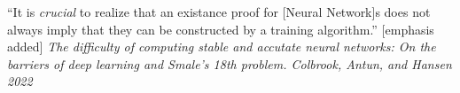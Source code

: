 \documentclass[convert=imagemagick, crop=true]{standalone}
\begin{document}
\parbox[t][72pt][c]{300pt}{
	``It is \emph{crucial} to realize that an existance proof for [Neural
	Network]s does not always imply that they can be constructed by a
	training algorithm.'' [emphasis added]
\textit{The difficulty of computing stable and accutate neural
	networks: On the barriers of deep learning and Smale's 18th
	problem. Colbrook, Antun, and Hansen 2022}
}
\end{document}
